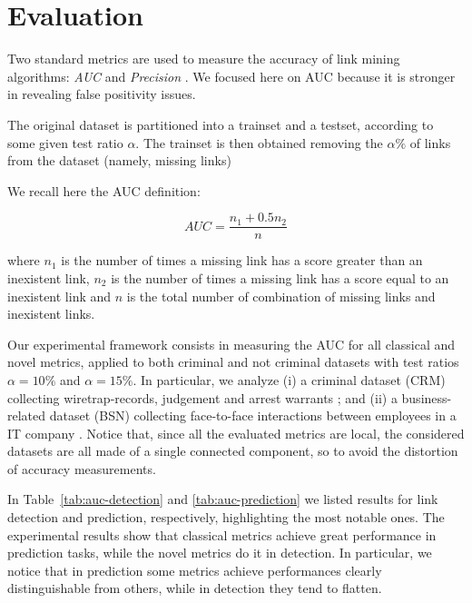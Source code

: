 \section{Evaluation}
\label{sec:evaluation}

Two standard metrics are used to measure the accuracy of link mining algorithms: \textit{AUC} and  \textit{Precision} \cite{Lu2011}. We focused here on AUC because it is stronger in revealing false positivity issues.

The original dataset is partitioned into a trainset and a testset, according to some given test ratio $\alpha$. The trainset is then obtained removing the $\alpha\%$ of links from the dataset (namely, missing links)

We recall here the AUC definition:

\begin{equation}
\label{eqn:auc}
AUC=\frac{n_{1}+0.5n_{2}}{n}
\end{equation}

where 
$n_{1}$ is the number of times a missing link has a score greater than an inexistent link,
$n_{2}$ is the number of times a missing link has a score equal to an inexistent link and
$n$ is the total number of combination of missing links and inexistent links.

Our experimental framework consists in measuring the AUC for all classical and novel metrics, applied to both criminal and not criminal datasets with test ratios $\alpha=10\%$ and $\alpha=15\%$.
In particular, we analyze 
(i) a criminal dataset (CRM) collecting wiretrap-records, judgement and arrest warrants \cite{berlusconi2016link}; and
(ii) a business-related dataset (BSN) collecting face-to-face interactions between employees in a IT company \cite{olguin2009sensible}.
Notice that, since all the evaluated metrics are local, the considered datasets are all made of a single connected component, so to avoid the distortion of accuracy measurements.

In Table~\ref{tab:auc-detection} and \ref{tab:auc-prediction} we listed results for link detection and prediction, respectively, highlighting the most notable ones.
The experimental results show that classical metrics achieve great performance in prediction tasks, while the novel metrics do it in detection.
In particular, we notice that in prediction some metrics achieve performances clearly distinguishable from others, while in detection they tend to flatten.


